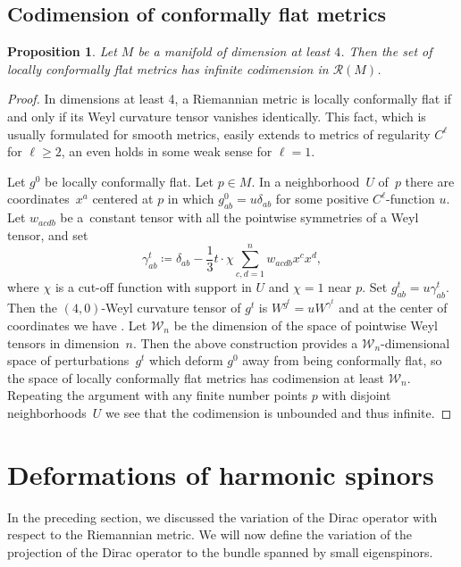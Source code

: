 \documentclass[pdftex]{sigma}
\newcommand\ceq{\coloneqq}
\newcommand\<{\langle}
\renewcommand\>{\rangle}
\newcommand{\maR}{\mathcal R}
\newcommand{\maW}{\mathcal W}
\newtheorem{Proposition}[Theorem]{Proposition}
\theoremstyle{definition}
\newcommand\={\,=\,}
\numberwithin{equation}{section}
\begin{document}
\subsection{Codimension of conformally flat metrics}

\begin{Proposition} \label{prop.CF.codim}
Let $M$ be a manifold of dimension at least $4$. Then the set of locally conformally flat metrics has infinite codimension in $\maR(M)$.
\end{Proposition}

\begin{proof}
 In dimensions at least 4, a Riemannian metric is locally conformally flat if and only if its Weyl curvature tensor vanishes identically.
 This fact, which is usually formulated for smooth metrics, easily extends to metrics of regularity $C^\ell$ for $\ell\geq 2$, an even holds in some weak sense for $\ell=1$.

Let $g^0$ be locally conformally flat. Let $ p \in M$. In a neighborhood~$U$ of~$p$ there are coordinates~$x^a$ centered at $p$ in which $g^0_{ab} = u \delta_{ab}$ for some positive $C^\ell$-function $u$. Let $w_{acdb}$ be a~constant tensor with all the pointwise symmetries of a Weyl tensor, and set
\[
\gamma^t_{ab} \ceq \delta_{ab} - \frac{1}{3} t \cdot \chi \sum_{c,d=1}^n w_{acdb} x^c x^d,
\]
where $\chi$ is a cut-off function with support in $U$ and $\chi=1$ near $p$. Set $g^t_{ab} = u \gamma^t_{ab}$. Then the $(4,0)$-Weyl curvature tensor of $g^t$ is $W^{g^t} = u W^{\gamma^t}$ and at the center of coordinates we have . Let $\maW_n$ be the dimension of the space of pointwise Weyl tensors in dimension~$n$. Then the above construction provides a $\maW_n$-dimensional space of perturbations~$g^t$ which deform $g^0$ away from being conformally flat, so the space of locally conformally flat metrics has codimension at least $\maW_n$. Repeating the argument with any finite number points $p$ with disjoint neighborhoods~$U$ we see that the codimension is unbounded and thus infinite.
\end{proof}

\section{Deformations of harmonic spinors}\label{sec.def.harm.spinors}

In the preceding section, we discussed the variation of the Dirac operator with respect to the Riemannian metric. We will now define the variation of the projection of the Dirac operator to the bundle spanned by small eigenspinors.
\end{document}
